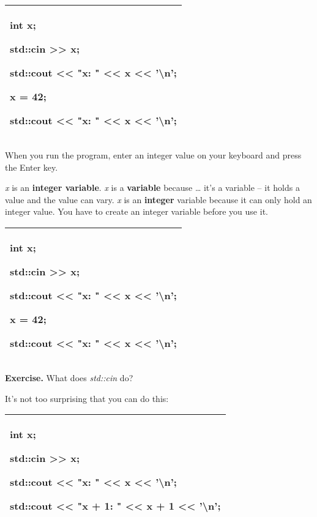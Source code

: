 \documentclass[
]{article}
\begin{document}
\begin{longtable}[]{@{}l@{}}
\toprule
\endhead
\begin{minipage}[t]{0.97\columnwidth}\raggedright
int x;

std::cin \textgreater\textgreater{} x;

std::cout \textless\textless{} "x: " \textless\textless{} x
\textless\textless{} '\textbackslash n';

x = 42;

std::cout \textless\textless{} "x: " \textless\textless{} x
\textless\textless{} '\textbackslash n';\strut
\end{minipage}\tabularnewline
\bottomrule
\end{longtable}

When you run the program, enter an integer value on your keyboard and
press the Enter key.

\emph{x} is an \textbf{integer variable}. \emph{x} is a
\textbf{variable} because \ldots{} it's a variable -- it holds a value
and the value can vary. \emph{x} is an \textbf{integer} variable because
it can only hold an integer value. You have to create an integer
variable before you use it.

\begin{longtable}[]{@{}l@{}}
\toprule
\endhead
\begin{minipage}[t]{0.97\columnwidth}\raggedright
int x;

std::cin \textgreater\textgreater{} x;

std::cout \textless\textless{} "x: " \textless\textless{} x
\textless\textless{} '\textbackslash n';

x = 42;

std::cout \textless\textless{} "x: " \textless\textless{} x
\textless\textless{} '\textbackslash n';\strut
\end{minipage}\tabularnewline
\bottomrule
\end{longtable}

\textbf{Exercise.} What does \emph{std::cin} do?

It's not too surprising that you can do this:

\begin{longtable}[]{@{}l@{}}
\toprule
\endhead
\begin{minipage}[t]{0.97\columnwidth}\raggedright
int x;

std::cin \textgreater\textgreater{} x;

std::cout \textless\textless{} "x: " \textless\textless{} x
\textless\textless{} '\textbackslash n';

std::cout \textless\textless{} "x + 1: " \textless\textless{} x + 1
\textless\textless{} '\textbackslash n';\strut
\end{minipage}\tabularnewline
\bottomrule
\end{longtable}
\end{document}
